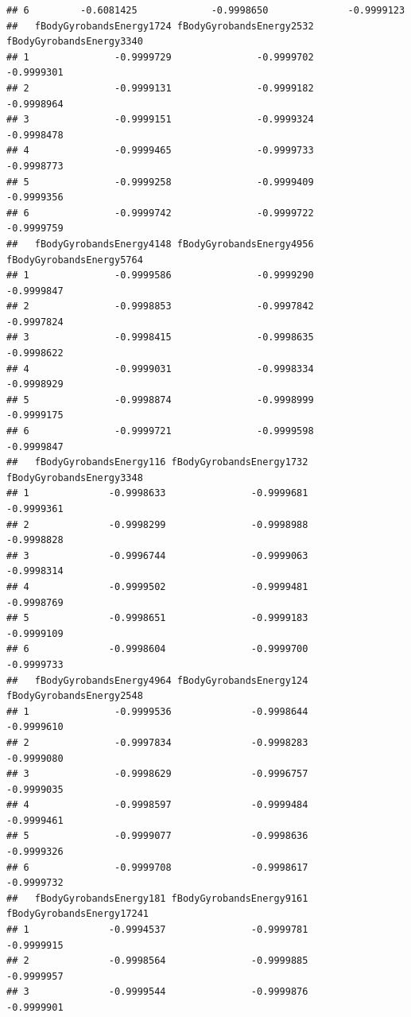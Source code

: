 \documentclass[
]{article}
\begin{document}
\begin{verbatim}
## 6         -0.6081425             -0.9998650              -0.9999123
##   fBodyGyrobandsEnergy1724 fBodyGyrobandsEnergy2532 fBodyGyrobandsEnergy3340
## 1               -0.9999729               -0.9999702               -0.9999301
## 2               -0.9999131               -0.9999182               -0.9998964
## 3               -0.9999151               -0.9999324               -0.9998478
## 4               -0.9999465               -0.9999733               -0.9998773
## 5               -0.9999258               -0.9999409               -0.9999356
## 6               -0.9999742               -0.9999722               -0.9999759
##   fBodyGyrobandsEnergy4148 fBodyGyrobandsEnergy4956 fBodyGyrobandsEnergy5764
## 1               -0.9999586               -0.9999290               -0.9999847
## 2               -0.9998853               -0.9997842               -0.9997824
## 3               -0.9998415               -0.9998635               -0.9998622
## 4               -0.9999031               -0.9998334               -0.9998929
## 5               -0.9998874               -0.9998999               -0.9999175
## 6               -0.9999721               -0.9999598               -0.9999847
##   fBodyGyrobandsEnergy116 fBodyGyrobandsEnergy1732 fBodyGyrobandsEnergy3348
## 1              -0.9998633               -0.9999681               -0.9999361
## 2              -0.9998299               -0.9998988               -0.9998828
## 3              -0.9996744               -0.9999063               -0.9998314
## 4              -0.9999502               -0.9999481               -0.9998769
## 5              -0.9998651               -0.9999183               -0.9999109
## 6              -0.9998604               -0.9999700               -0.9999733
##   fBodyGyrobandsEnergy4964 fBodyGyrobandsEnergy124 fBodyGyrobandsEnergy2548
## 1               -0.9999536              -0.9998644               -0.9999610
## 2               -0.9997834              -0.9998283               -0.9999080
## 3               -0.9998629              -0.9996757               -0.9999035
## 4               -0.9998597              -0.9999484               -0.9999461
## 5               -0.9999077              -0.9998636               -0.9999326
## 6               -0.9999708              -0.9998617               -0.9999732
##   fBodyGyrobandsEnergy181 fBodyGyrobandsEnergy9161 fBodyGyrobandsEnergy17241
## 1              -0.9994537               -0.9999781                -0.9999915
## 2              -0.9998564               -0.9999885                -0.9999957
## 3              -0.9999544               -0.9999876                -0.9999901

\end{verbatim}
\end{document}
